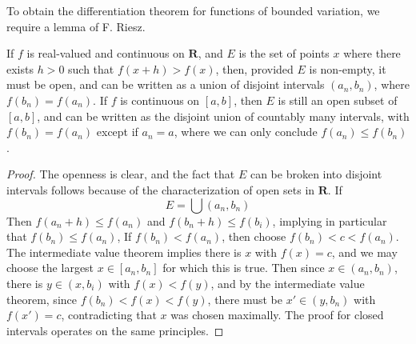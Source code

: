 To obtain the differentiation theorem for functions of bounded variation, we require a lemma of F. Riesz.

\begin{lemma}
    If $f$ is real-valued and continuous on $\mathbf{R}$, and $E$ is the set of points $x$ where there exists $h > 0$ such that $f(x+h) > f(x)$, then, provided $E$ is non-empty, it must be open, and can be written as a union of disjoint intervals $(a_n,b_n)$, where $f(b_n) = f(a_n)$. If $f$ is continuous on $[a,b]$, then $E$ is still an open subset of $[a,b]$, and can be written as the disjoint union of countably many intervals, with $f(b_n) = f(a_n)$ except if $a_n = a$, where we can only conclude $f(a_n) \leq f(b_n)$.
\end{lemma}
\begin{proof}
  The openness is clear, and the fact that $E$ can be broken into disjoint intervals follows because of the characterization of open sets in $\mathbf{R}$. If
  \[ E = \bigcup (a_n,b_n) \]
  Then $f(a_n + h) \leq f(a_n)$ and $f(b_n + h) \leq f(b_i)$, implying in particular that $f(b_n) \leq f(a_n)$, If $f(b_n) < f(a_n)$, then choose $f(b_n) < c < f(a_n)$. The intermediate value theorem implies there is $x$ with $f(x) = c$, and we may choose the largest $x \in [a_n,b_n]$ for which this is true. Then since $x \in (a_n,b_n)$, there is $y \in (x,b_i)$ with $f(x) < f(y)$, and by the intermediate value theorem, since $f(b_n) < f(x) < f(y)$, there must be $x' \in (y,b_n)$ with $f(x') = c$, contradicting that $x$ was chosen maximally. The proof for closed intervals operates on the same principles.
\end{proof}

